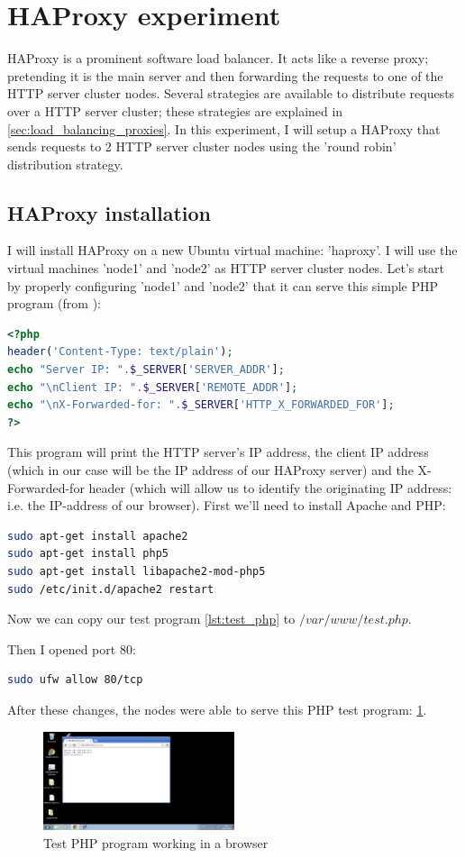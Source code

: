 \documentclass[12pt]{report}
\begin{document}
\section{HAProxy experiment}
\label{ha_proxy_experiment}
HAProxy is a prominent software load balancer. It acts like a reverse
proxy; pretending it is the main server and then forwarding the
requests to one of the HTTP server cluster nodes.
Several strategies are available to distribute requests over a HTTP
server cluster; these strategies are explained in
\ref{sec:load_balancing_proxies}.
In this experiment, I will setup a HAProxy that sends requests to 2
HTTP server cluster nodes using the 'round robin' distribution
strategy.
\subsection{HAProxy installation}
I will install HAProxy on a new Ubuntu virtual machine: 'haproxy'.
I will use the virtual machines 'node1' and 'node2' as HTTP server cluster nodes.
Let's start by properly configuring 'node1' and 'node2' that it can
serve this simple PHP program (from \cite{haproxy_install_tutorial}):
\label{lst:test_php}
\begin{lstlisting}[language=php]
<?php
header('Content-Type: text/plain');
echo "Server IP: ".$_SERVER['SERVER_ADDR'];
echo "\nClient IP: ".$_SERVER['REMOTE_ADDR'];
echo "\nX-Forwarded-for: ".$_SERVER['HTTP_X_FORWARDED_FOR'];
?>
\end{lstlisting} 
This program will print the HTTP server's IP address, the client IP
address (which in our case will be the IP address of our HAProxy
server) and the X-Forwarded-for header (which will allow us to identify
the originating IP address: i.e. the IP-address of our browser).
First we'll need to install Apache and PHP:
\begin{lstlisting}[language=bash]
sudo apt-get install apache2
sudo apt-get install php5
sudo apt-get install libapache2-mod-php5
sudo /etc/init.d/apache2 restart
\end{lstlisting} 
Now we can copy our test program \ref{lst:test_php} to
$/var/www/test.php$.

Then I opened port 80:
\begin{lstlisting}[language=bash]
  sudo ufw allow 80/tcp
\end{lstlisting} 

After these changes, the nodes were able to serve this PHP test
program: \ref{fig:test_php_working}.

\begin{figure}[h!]
  \caption{Test PHP program working in a browser}
  \label{fig:test_php_working}
  \centering
    \includegraphics[width=0.5\textwidth]{pics/test_php_working.png}
\end{figure}
\end{document}
